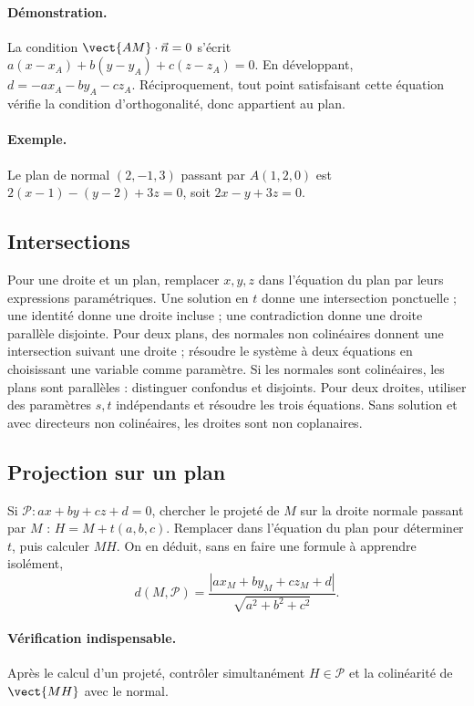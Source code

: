 \paragraph{Démonstration.} La condition $\vect{AM}\cdot\vec n=0$ s'écrit $a(x-x_A)+b(y-y_A)+c(z-z_A)=0$. En développant, $d=-ax_A-by_A-cz_A$. Réciproquement, tout point satisfaisant cette équation vérifie la condition d'orthogonalité, donc appartient au plan.
\paragraph{Exemple.} Le plan de normal $(2,-1,3)$ passant par $A(1,2,0)$ est $2(x-1)-(y-2)+3z=0$, soit $2x-y+3z=0$.
\subsection{Intersections}
Pour une droite et un plan, remplacer $x,y,z$ dans l'équation du plan par leurs expressions paramétriques. Une solution en $t$ donne une intersection ponctuelle ; une identité donne une droite incluse ; une contradiction donne une droite parallèle disjointe.
Pour deux plans, des normales non colinéaires donnent une intersection suivant une droite ; résoudre le système à deux équations en choisissant une variable comme paramètre. Si les normales sont colinéaires, les plans sont parallèles : distinguer confondus et disjoints.
Pour deux droites, utiliser des paramètres $s,t$ indépendants et résoudre les trois équations. Sans solution et avec directeurs non colinéaires, les droites sont non coplanaires.
\subsection{Projection sur un plan}
Si $\mathcal P:ax+by+cz+d=0$, chercher le projeté de $M$ sur la droite normale passant par $M$ : $H=M+t(a,b,c)$. Remplacer dans l'équation du plan pour déterminer $t$, puis calculer $MH$.
On en déduit, sans en faire une formule à apprendre isolément,
\[d(M,\mathcal P)=\frac{|ax_M+by_M+cz_M+d|}{\sqrt{a^2+b^2+c^2}}.\]
\paragraph{Vérification indispensable.} Après le calcul d'un projeté, contrôler simultanément $H\in\mathcal P$ et la colinéarité de $\vect{MH}$ avec le normal.


